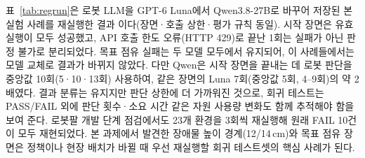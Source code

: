 표~\ref{tab:regrun}은 로봇 LLM을 GPT-6 Luna에서 Qwen3.8-27B로 바꾸어 저장된 본 실험 사례를 재실행한 결과 이다(장면·호출 상한·평가 규칙 동일). 
시작 장면은 유효 실행이 모두 성공했고, API 호출 한도 오류(HTTP 429)로 끝난 1회는 실패가 아닌 판정 불가로 분리되었다. 
목표 점유 실패는 두 모델 모두에서 유지되어, 이 사례들에서는 모델 교체로 결과가 바뀌지 않았다. 
다만 Qwen은 시작 장면을 끝내는 데 로봇 판단을 중앙값 10회(5·10·13회) 사용하여, 같은 장면의 Luna 7회(중앙값 5회, 4--9회)의 약 2배였다. 
결과 분류는 유지지만 판단 상한에 더 가까워진 것으로, 회귀 테스트는 PASS/FAIL 외에 판단 횟수·소요 시간 같은 자원 사용량 변화도 함께 추적해야 함을 보여 준다. 
로봇팔 개발 단계 점검에서도 23개 환경을 3회씩 재실행해 원래 FAIL 10건이 모두 재현되었다.
본 과제에서 발견한 장애물 높이 경계(12/14\,cm)와 목표 점유 장면은 정책이나 현장 배치가 바뀔 때 우선 재실행할 회귀 테스트셋의 핵심 사례가 된다.
